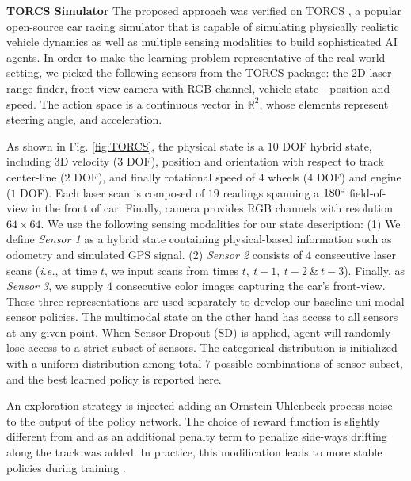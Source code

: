\documentclass[../thesis.tex]{subfiles}
\begin{document}
\textbf{TORCS Simulator}
The proposed approach was verified on TORCS \cite{wymann2000torcs}, a popular open-source car racing simulator that is capable of simulating physically realistic vehicle dynamics as well as multiple sensing modalities \cite{GymTORCS} to build sophisticated AI agents. In order to make the learning problem representative of the real-world setting, we picked the following sensors from the TORCS package: the 2D laser range finder, front-view camera with RGB channel, vehicle state - position and speed. The action space is a continuous vector in $\mathbb{R}^2$, whose elements represent steering angle, and acceleration. 

As shown in Fig. \ref{fig:TORCS}, the physical state is a $10$ DOF hybrid state, including $3$D velocity ($3$ DOF), position and orientation with respect to track center-line ($2$ DOF), and finally rotational speed of $4$ wheels ($4$ DOF) and engine ($1$ DOF). Each laser scan is composed of $19$ readings spanning a $180\degree$ field-of-view in the front of car. Finally, camera provides RGB channels with resolution $64 \times 64$. We use the following sensing modalities for our state description: (1) We define \emph{Sensor 1} as a hybrid state containing physical-based information such as odometry and simulated GPS signal. (2) \emph{Sensor 2} consists of $4$ consecutive laser scans (\textit{i.e.}, at time $t$, we input scans from times $t,~ t-1,~t-2~\&~t-3$). Finally, as \emph{Sensor 3}, we supply $4$ consecutive color images capturing the car's front-view. These three representations are used separately to develop our baseline uni-modal sensor policies. The multimodal state on the other hand has access to all sensors at any given point. When Sensor Dropout (SD) is applied, agent will randomly lose access to a strict subset of sensors. The categorical distribution is initialized with a uniform distribution among total $7$ possible combinations of sensor subset, and the best learned policy is reported here. 

An exploration strategy is injected adding an Ornstein-Uhlenbeck process noise \cite{uhlenbeck1930theory} to the output of the policy network. The choice of reward function is slightly different from  \citet{DBLP:journals/corr/LillicrapHPHETS15} and \citet{A3C} as an additional penalty term to penalize side-ways drifting along the track was added. In practice, this modification leads to more stable policies during training \cite{BenLau16}. 
\end{document}
